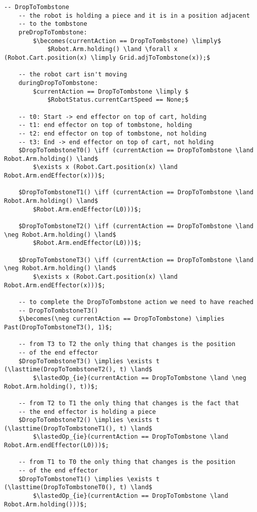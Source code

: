 \begin{lstlisting}[fontadjust, mathescape, frame=single]
  -- DropToTombstone
    -- the robot is holding a piece and it is in a position adjacent 
    -- to the tombstone
    preDropToTombstone:
        $\becomes(currentAction == DropToTombstone) \limply$
            $Robot.Arm.holding() \land \forall x (Robot.Cart.position(x) \limply Grid.adjToTombstone(x));$

    -- the robot cart isn't moving
    duringDropToTombstone:
        $currentAction == DropToTombstone \limply $
            $RobotStatus.currentCartSpeed == None;$

    -- t0: Start -> end effector on top of cart, holding
    -- t1: end effector on top of tombstone, holding
    -- t2: end effector on top of tombstone, not holding
    -- t3: End -> end effector on top of cart, not holding
    $DropToTombstoneT0() \iff (currentAction == DropToTombstone \land Robot.Arm.holding() \land$
        $\exists x (Robot.Cart.position(x) \land Robot.Arm.endEffector(x)))$;
    
    $DropToTombstoneT1() \iff (currentAction == DropToTombstone \land Robot.Arm.holding() \land$
        $Robot.Arm.endEffector(L0)))$;
    
    $DropToTombstoneT2() \iff (currentAction == DropToTombstone \land \neg Robot.Arm.holding() \land$
        $Robot.Arm.endEffector(L0)))$;
    
    $DropToTombstoneT3() \iff (currentAction == DropToTombstone \land \neg Robot.Arm.holding() \land$
        $\exists x (Robot.Cart.position(x) \land Robot.Arm.endEffector(x)))$;
    
    -- to complete the DropToTombstone action we need to have reached
    -- DropToTombstoneT3()
    $\becomes(\neg currentAction == DropToTombstone) \implies Past(DropToTombstoneT3(), 1)$;
    
    -- from T3 to T2 the only thing that changes is the position
    -- of the end effector
    $DropToTombstoneT3() \implies \exists t (\lasttime(DropToTombstoneT2(), t) \land$
        $\lastedOp_{ie}(currentAction == DropToTombstone \land \neg Robot.Arm.holding(), t))$;

    -- from T2 to T1 the only thing that changes is the fact that
    -- the end effector is holding a piece
    $DropToTombstoneT2() \implies \exists t (\lasttime(DropToTombstoneT1(), t) \land$
        $\lastedOp_{ie}(currentAction == DropToTombstone \land Robot.Arm.endEffector(L0)))$;
    
    -- from T1 to T0 the only thing that changes is the position
    -- of the end effector
    $DropToTombstoneT1() \implies \exists t (\lasttime(DropToTombstoneT0(), t) \land$
        $\lastedOp_{ie}(currentAction == DropToTombstone \land Robot.Arm.holding()))$;


\end{lstlisting}
